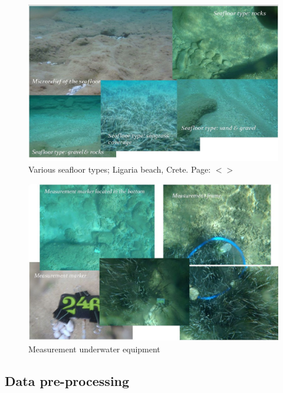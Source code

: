 \documentclass[11pt]{article}
\begin{document}
\begin{appendices}
\begin{figure}[H]
	\begin{center}
		\includegraphics[scale=0.3]{Fig-3-15.jpg}
		\caption{Various seafloor types; Ligaria beach, Crete. Page: $<$\pageref{page-28}$>$}\label{fig:A.6}
	\end{center}
\end{figure}

\begin{figure}[H]
	\begin{center}
		\includegraphics[scale=0.3]{Fig-3-16.jpg}
		\caption{Measurement underwater equipment}\label{fig:A.7}		
	\end{center}
\end{figure}
\pagebreak

\subsection{Data pre-processing}


\end{appendices}
\end{document}
